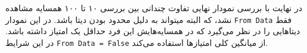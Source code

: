 در نهایت با بررسی نمودار نهایی تفاوت چندانی بین بررسی ۱۰ تا ۱۰۰ همسایه مشاهده نشد، که البته میتواند به دلیل محدود بودن دیتا باشد.
در این نمودار
\verb;From Data;
فقط دیتا‌هایی را در نظر می‌گیرد که در همسایه‌هایش این فرد حداقل یک امتیاز داشته باشد.
در این شرایط
\verb;From Data = False;
از میانگین کلی امتیاز‌ها استفاده می‌کند.



